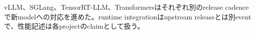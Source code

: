 
vLLM、SGLang、TensorRT-LLM、Transformersはそれぞれ別のrelease cadenceで新modelへの対応を進めた。runtime integrationはupstream releaseとは別eventで、性能記述は各projectのclaimとして扱う。\autocite{src-04b5c0f10b59,src-2595cdd4fabc,src-283a52c58291,src-4197b73cea93,src-43eaa2f12960,src-455a78bc36fa,src-58ef6e84aa65,src-a783d282600b,src-d4b1979540fd,src-ee0eb9562688}
